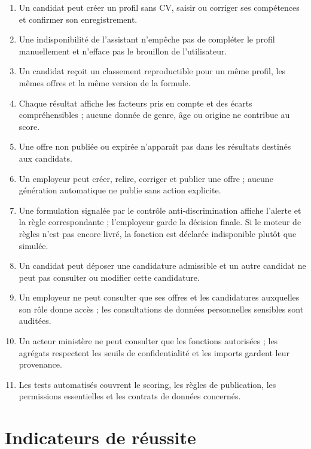 \documentclass[11pt,a4paper]{article}
\begin{document}
\begin{enumerate}
  \item Un candidat peut créer un profil sans CV, saisir ou corriger ses compétences et confirmer son enregistrement.
  \item Une indisponibilité de l'assistant n'empêche pas de compléter le profil manuellement et n'efface pas le brouillon de l'utilisateur.
  \item Un candidat reçoit un classement reproductible pour un même profil, les mêmes offres et la même version de la formule.
  \item Chaque résultat affiche les facteurs pris en compte et des écarts compréhensibles ; aucune donnée de genre, âge ou origine ne contribue au score.
  \item Une offre non publiée ou expirée n'apparaît pas dans les résultats destinés aux candidats.
  \item Un employeur peut créer, relire, corriger et publier une offre ; aucune génération automatique ne publie sans action explicite.
  \item Une formulation signalée par le contrôle anti-discrimination affiche l'alerte et la règle correspondante ; l'employeur garde la décision finale. Si le moteur de règles n'est pas encore livré, la fonction est déclarée indisponible plutôt que simulée.
  \item Un candidat peut déposer une candidature admissible et un autre candidat ne peut pas consulter ou modifier cette candidature.
  \item Un employeur ne peut consulter que ses offres et les candidatures auxquelles son rôle donne accès ; les consultations de données personnelles sensibles sont auditées.
  \item Un acteur ministère ne peut consulter que les fonctions autorisées ; les agrégats respectent les seuils de confidentialité et les imports gardent leur provenance.
  \item Les tests automatisés couvrent le scoring, les règles de publication, les permissions essentielles et les contrats de données concernés.
\end{enumerate}

\section{Indicateurs de réussite}
\end{document}
